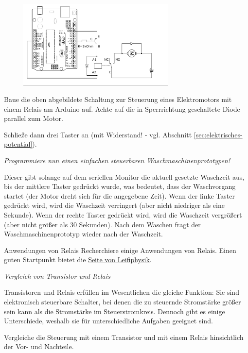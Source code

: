 \begin{projekt}[Waschmaschinensteuerung]\label{proj:waschmaschinensteuerung}
	\begin{figure}[H]
		\centering
		\includegraphics[width=0.7\textwidth]{./Zeichnungen/relais-schaltung-mit-motor.png}
	\end{figure}
	Baue die oben abgebildete Schaltung zur Steuerung eines Elektromotors mit einem Relais am Arduino auf. Achte auf die in Sperrrichtung geschaltete Diode parallel zum Motor.
	
	Schließe dann drei Taster an (mit Widerstand! - vgl. Abschnitt \ref{sec:elektrisches-potential}).
	
	\emph{Programmiere nun einen einfachen steuerbaren Waschmaschinenprototypen!}
	
	Dieser gibt solange auf dem seriellen Monitor die aktuell gesetzte Waschzeit aus, bis der mittlere Taster gedrückt wurde, was bedeutet, dass der Waschvorgang startet (der Motor dreht sich für die angegebene Zeit). Wenn der linke Taster gedrückt wird, wird die Waschzeit verringert (aber nicht niedriger als eine Sekunde). Wenn der rechte Taster gedrückt wird, wird die Waschzeit vergrößert (aber nicht größer als 30 Sekunden). Nach dem Waschen fragt der Waschmaschinenprototyp wieder nach der Waschzeit.
\end{projekt}

\begin{recherche}{Anwendungen von Relais}
	Recherchiere einige Anwendungen von Relais. Einen guten Startpunkt bietet die \href{https://www.leifiphysik.de/elektrizitaetslehre/elektromagnetismus/ausblick/relais}{Seite von Leifiphysik}.
\end{recherche}

\begin{aufgabe} \emph{Vergleich von Transistor und Relais}
	
	Transistoren und Relais erfüllen im Wesentlichen die gleiche Funktion: Sie sind elektronisch steuerbare Schalter, bei denen die zu steuernde Stromstärke größer sein kann als die Stromstärke im Steuerstromkreis. Dennoch gibt es einige Unterschiede, weshalb sie für unterschiedliche Aufgaben geeignet sind.
	
	Vergleiche die Steuerung mit einem Transistor und mit einem Relais hinsichtlich der Vor- und Nachteile.
\end{aufgabe}

